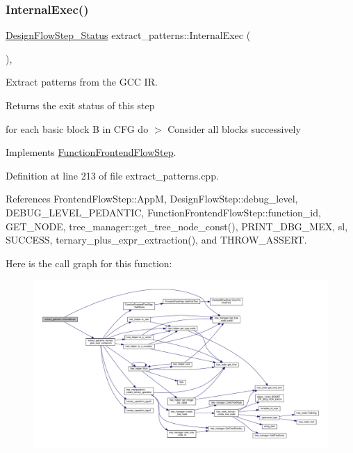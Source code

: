\subsubsection{\texorpdfstring{Internal\+Exec()}{InternalExec()}}
{\footnotesize\ttfamily \hyperlink{design__flow__step_8hpp_afb1f0d73069c26076b8d31dbc8ebecdf}{Design\+Flow\+Step\+\_\+\+Status} extract\+\_\+patterns\+::\+Internal\+Exec (\begin{DoxyParamCaption}{ }\end{DoxyParamCaption})\hspace{0.3cm}{\ttfamily [override]}, {\ttfamily [virtual]}}



Extract patterns from the G\+CC IR. 

\begin{DoxyReturn}{Returns}
the exit status of this step 
\end{DoxyReturn}
for each basic block B in C\+FG do $>$ Consider all blocks successively 

Implements \hyperlink{classFunctionFrontendFlowStep_a00612f7fb9eabbbc8ee7e39d34e5ac68}{Function\+Frontend\+Flow\+Step}.



Definition at line 213 of file extract\+\_\+patterns.\+cpp.



References Frontend\+Flow\+Step\+::\+AppM, Design\+Flow\+Step\+::debug\+\_\+level, D\+E\+B\+U\+G\+\_\+\+L\+E\+V\+E\+L\+\_\+\+P\+E\+D\+A\+N\+T\+IC, Function\+Frontend\+Flow\+Step\+::function\+\_\+id, G\+E\+T\+\_\+\+N\+O\+DE, tree\+\_\+manager\+::get\+\_\+tree\+\_\+node\+\_\+const(), P\+R\+I\+N\+T\+\_\+\+D\+B\+G\+\_\+\+M\+EX, sl, S\+U\+C\+C\+E\+SS, ternary\+\_\+plus\+\_\+expr\+\_\+extraction(), and T\+H\+R\+O\+W\+\_\+\+A\+S\+S\+E\+RT.

Here is the call graph for this function\+:
\nopagebreak
\begin{figure}[H]
\begin{center}
\leavevmode
\includegraphics[width=350pt]{d6/db8/classextract__patterns_accaa03e77d1878c22602ff594e1206d3_cgraph}
\end{center}
\end{figure}
\mbox{\label{classextract__patterns_aa8360e2e8d2a377b8d0938d9c50c6771}} 
